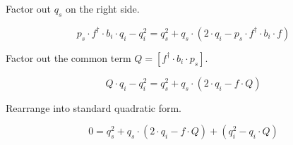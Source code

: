 Factor out $q_s$ on the right side.

\begin{equation*}
	p_s \cdot f^{\dagger} \cdot b_i \cdot q_i - q_i^ 2 =
	q_s^2 + q_s \cdot (2 \cdot q_i - p_s \cdot f^{\dagger} \cdot b_i \cdot f)
\end{equation*}

Factor out the common term $Q = [f^{\dagger} \cdot b_i \cdot p_s]$.

\begin{equation*}
	Q \cdot q_i - q_i^ 2 = q_s^2 + q_s \cdot (2 \cdot q_i - f \cdot Q)
\end{equation*}

Rearrange into standard quadratic form.

\begin{equation*}
	0 = q_s^2 + q_s \cdot (2 \cdot q_i - f \cdot Q) + (q_i^2 - q_i \cdot Q)
\end{equation*}
